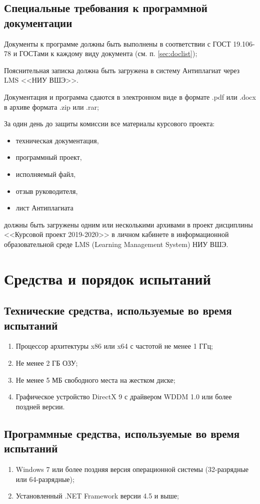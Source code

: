 \documentclass[a4paper,12pt]{article}
\begin{document}
  \subsection{Специальные требования к программной документации}
  Документы к программе должны быть выполнены в соответствии с ГОСТ 19.106-78 и ГОСТами к каждому виду документа
  (см. п. \ref{sec:doclist});

  Пояснительная записка должна быть загружена в систему Антиплагиат через LMS <<НИУ ВШЭ>>.

  Документация и программа сдаются в электронном виде в формате .pdf или .docx в архиве формата .zip или .rar;

  За один день до защиты комиссии все материалы курсового проекта:
  \begin{itemize}
    \item техническая документация,
    \item программный проект,
    \item исполняемый файл,
    \item отзыв руководителя,
    \item лист Антиплагиата
  \end{itemize}
  должны быть загружены одним или несколькими архивами в проект дисциплины <<Курсовой проект 2019-2020>> в личном кабинете в информационной образовательной среде LMS (Learning Management System) НИУ ВШЭ.

  \newpage
  \section{Средства и порядок испытаний}
  \subsection{Технические средства, используемые во время испытаний}
  \begin{enumerate}
    \item Процессор архитектуры x86 или x64 с частотой не менее 1 ГГц;
    \item Не менее 2 ГБ ОЗУ;
    \item Не менее 5 МБ свободного места на жестком диске;
    \item Графическое устройство DirectX 9 с драйвером WDDM 1.0 или более поздней версии.
  \end{enumerate}
  \subsection{Программные средства, используемые во время испытаний}
  \begin{enumerate}
    \item Windows 7 или более поздняя версия операционной системы (32-разрядные или 64-разрядные);
    \item Установленный .NET Framework версии 4.5 и выше;
  \end{enumerate}
\end{document}
